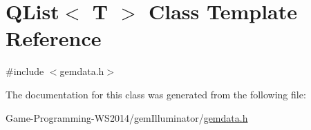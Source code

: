 \hypertarget{class_q_list}{}\section{Q\+List$<$ T $>$ Class Template Reference}
\label{class_q_list}


{\ttfamily \#include $<$gemdata.\+h$>$}



The documentation for this class was generated from the following file\+:\begin{DoxyCompactItemize}
\item 
Game-\/\+Programming-\/\+W\+S2014/gem\+Illuminator/\hyperlink{gemdata_8h}{gemdata.\+h}\end{DoxyCompactItemize}
